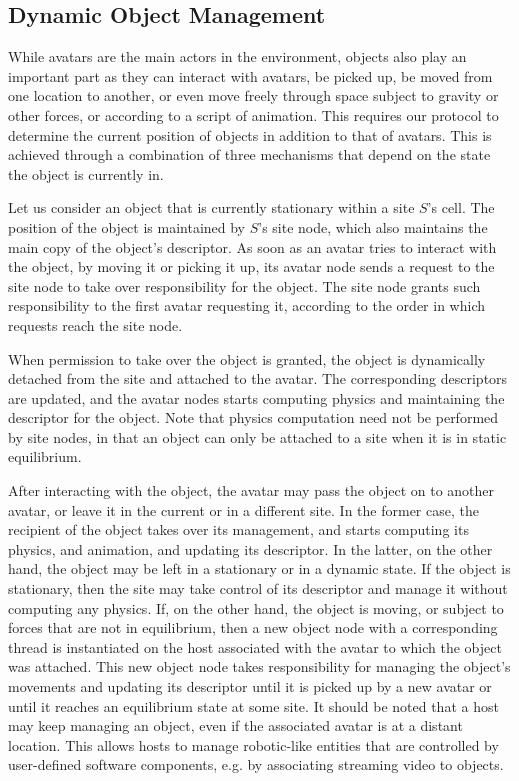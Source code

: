  
\subsection{Dynamic Object Management }
\label{sec:manag-inan-objects}
While avatars are the main actors in the \sol environment, objects
also play an important part as they can interact with avatars, be
picked up, be moved from one location to another, or even move freely
through space subject to gravity or other forces, or according to a
script of animation. This requires our protocol to determine the
current position of objects in addition to that of avatars. This is
achieved through a combination of three mechanisms that depend on the
state the object is currently in.

Let us consider an object that is currently stationary within a site
$S$'s cell. The position of the object is maintained by $S$'s site
node, which also maintains the main copy of the object's
descriptor. As soon as an avatar tries to interact with the object, by
moving it or picking it up, its avatar node sends a request to the
site node to take over responsibility for the object. The site node
grants such responsibility to the first avatar requesting it,
according to the order in which requests reach the site node.

When permission to take over the object is granted, the object is
dynamically detached from the site and attached to the avatar. The
corresponding descriptors are updated, and the avatar nodes starts
computing physics and maintaining the descriptor for the object. Note
that physics computation need not be performed by site nodes, in that
an object can only be attached to a site when it is in static
equilibrium.

After interacting with the object, the avatar may pass the object on
to another avatar, or leave it in the current or in a different
site. In the former case, the recipient of the object takes over its
management, and starts computing its physics, and animation, and
updating its descriptor.  In the latter, on the other hand, the object
may be left in a stationary or in a dynamic state. If the object is
stationary, then the site may take control of its descriptor and
manage it without computing any physics. If, on the other hand, the
object is moving, or subject to forces that are not in equilibrium,
then a new object node with a corresponding thread is instantiated on
the host associated with the avatar to which the object was
attached. This new object node takes responsibility for managing the
object's movements and updating its descriptor until it is picked up
by a new avatar or until it reaches an equilibrium state at some site.
It should be noted that a host may keep managing an object, even if
the associated avatar is at a distant location. This allows hosts to
manage robotic-like entities that are controlled by user-defined
software components, e.g. by associating streaming video to
objects.

